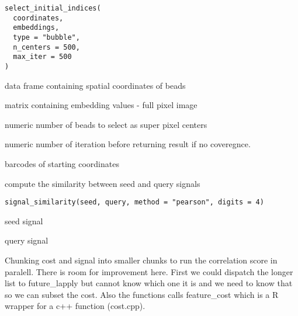 \documentclass[a4paper]{book}
\begin{document}
%
\begin{Usage}
\begin{verbatim}
select_initial_indices(
  coordinates,
  embeddings,
  type = "bubble",
  n_centers = 500,
  max_iter = 500
)
\end{verbatim}
\end{Usage}
%
\begin{Arguments}
\begin{ldescription}
\item[\code{coordinates}] data frame containing spatial coordinates of beads

\item[\code{embeddings}] matrix containing embedding values - full pixel image

\item[\code{n\_centers}] numeric number of beads to select as super pixel centers

\item[\code{max\_iter}] numeric number of iteration before returning result if 
no coveregnce.
\end{ldescription}
\end{Arguments}
%
\begin{Value}
barcodes of starting coordinates
\end{Value}
%
\begin{Description}
compute the similarity between seed and query signals
\end{Description}
%
\begin{Usage}
\begin{verbatim}
signal_similarity(seed, query, method = "pearson", digits = 4)
\end{verbatim}
\end{Usage}
%
\begin{Arguments}
\begin{ldescription}
\item[\code{seed}] seed signal

\item[\code{query}] query signal
\end{ldescription}
\end{Arguments}
%
\begin{Details}
Chunking cost and signal into smaller chunks to run the 
correlation score in paralell. There is room for improvement here.
First we could dispatch the longer list to future\_lapply
but cannot know which one it is and we need to know that so we can 
subset the cost. 
Also the functions calls feature\_cost which is a R wrapper for a 
c++ function (cost.cpp).
\end{Details}
\end{document}
